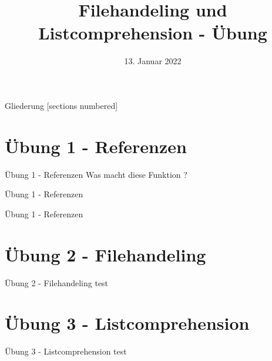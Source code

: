 



\title{Filehandeling und Listcomprehension - Übung}
\date{13. Januar 2022}


\maketitle

\begin{frame}{Gliederung}
	[sections numbered]
	\tableofcontents
\end{frame}

\section{Übung 1 - Referenzen}
\begin{frame}{Übung 1 - Referenzen}
	Was macht diese Funktion ?
	
\end{frame}
\begin{frame}{Übung 1 - Referenzen}
	
\end{frame}
\begin{frame}{Übung 1 - Referenzen}
	
\end{frame}

\section{Übung 2 - Filehandeling}
\begin{frame}{Übung 2 - Filehandeling}
	test
\end{frame}

\section{Übung 3 - Listcomprehension}
\begin{frame}{Übung 3 - Listcomprehension}
	test
\end{frame}


